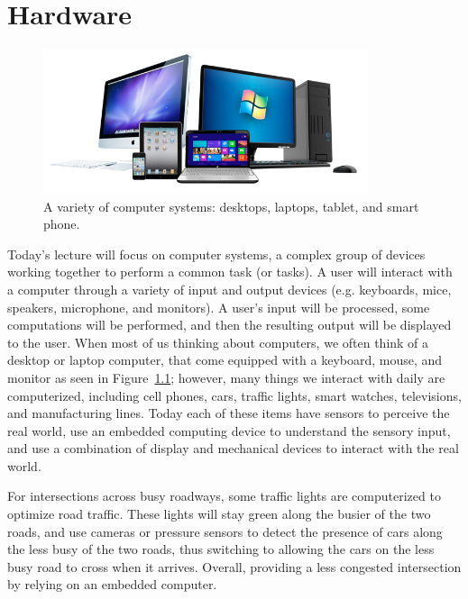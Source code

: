 \chapter{Hardware}

\begin{figure}
	\centering
	\includegraphics[width=0.85\textwidth]{images/computer_system.png}
	\caption{A variety of computer systems: desktops, laptops, tablet,
                 and smart phone.}
	\label{fig:hardware:computers}
\end{figure}

Today's lecture will focus on computer systems, a complex group of
devices working together to perform a common task (or tasks). A user
will interact with a computer through a variety of input and output
devices (e.g. keyboards, mice, speakers, microphone, and monitors). A
user's input will be processed, some computations will be performed,
and then the resulting output will be displayed to the user. When most
of us thinking about computers, we often think of a desktop or laptop
computer, that come equipped with a keyboard, mouse, and monitor as
seen in Figure~\ref{fig:hardware:computers};
however, many things we interact with daily are computerized,
including cell phones, cars, traffic lights, smart watches,
televisions, and manufacturing lines. Today each of these items
have sensors to perceive the real world, use an embedded computing
device to understand the sensory input, and use a combination of
display and mechanical devices to interact with the real world.

\begin{example}
For intersections across busy roadways, some traffic lights are
computerized to optimize road traffic. These lights will stay
green along the busier of the two roads, and use cameras or
pressure sensors to detect the presence of cars along the less
busy of the two roads, thus switching to allowing the cars on
the less busy road to cross when it arrives. Overall, providing
a less congested intersection by relying on an embedded computer.
\end{example}

